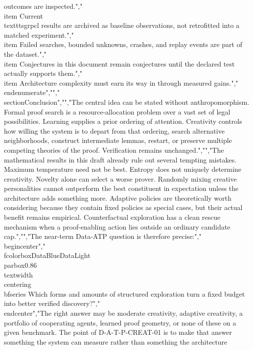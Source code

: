 {{{outcomes are inspected.","\\item Current \\texttt{sgrpcl} results are archived as baseline observations, not retrofitted into a matched experiment.","\\item Failed searches, bounded unknowns, crashes, and replay events are part of the dataset.","\\item Conjectures in this document remain conjectures until the declared test actually supports them.","\\item Architecture complexity must earn its way in through measured gains.","\\end{enumerate}","","\\section{Conclusion}","","The central idea can be stated without anthropomorphism. Formal proof search is a resource-allocation problem over a vast set of legal possibilities. Learning supplies a prior ordering of attention. Creativity controls how willing the system is to depart from that ordering, search alternative neighborhoods, construct intermediate lemmas, restart, or preserve multiple competing theories of the proof. Verification remains unchanged.","","The mathematical results in this draft already rule out several tempting mistakes. Maximum temperature need not be best. Entropy does not uniquely determine creativity. Novelty alone can select a worse prover. Randomly mixing creative personalities cannot outperform the best constituent in expectation unless the architecture adds something more. Adaptive policies are theoretically worth considering because they contain fixed policies as special cases, but their actual benefit remains empirical. Counterfactual exploration has a clean rescue mechanism when a proof-enabling action lies outside an ordinary candidate cap.","","The near-term Data-ATP question is therefore precise:","\\begin{center}","\\fcolorbox{DataBlue}{DataLight}{\\parbox{0.86\\textwidth}{\\centering\\bfseries Which forms and amounts of structured exploration turn a fixed budget into better verified discovery?}}","\\end{center}","The right answer may be moderate creativity, adaptive creativity, a portfolio of cooperating agents, learned proof geometry, or none of these on a given benchmark. The point of D-A-T-P-CREAT-01 is to make that answer something the system can measure rather than something the architecture }}}
